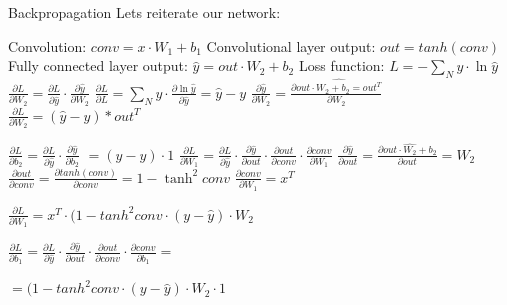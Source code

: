 \documentclass[12pt]{beamer}
\begin{document}
\begin{frame}{Backpropagation}
Lets  reiterate our network:

Convolution:                   $conv = x \cdot W_1 +b_1$ \newline
Convolutional layer output:    $out = tanh(conv)$\newline
Fully connected layer output:  $\hat{y} = out \cdot W_2 + b_2$\newline
Loss function:				   $L = - \sum_{N} y \cdot \ln{\hat{y}}$ \newline
\newline \newline
$\frac{\partial{L}}{\partial{W_2}} = \frac{\partial{L}}{\partial{\hat{y}}} \cdot \frac{\partial{\hat{y}}}{\partial{W_2}}$
\newline
$\frac{\partial{L}}{\partial{L}} = \sum_{N} y \cdot \frac{\partial{\ln{\hat{y}}}}{\partial{\hat{y}}} = \hat{y}-y$\newline
$\frac{\partial{\hat{y}}}{\partial{W_2}} = \frac{\partial{\hat{out \cdot W_2 +b_2 = out^T}}}{\partial{W_2}}$
$\frac{\partial{L}}{\partial{W_2}} = (\hat{y} - y) * out^T $
\end{frame}
\begin{frame}
$\frac{\partial{L}}{\partial{b_2}} = \frac{\partial{L}}{\partial{\hat{y}}} \cdot \frac{\partial{\hat{y}}}{\partial{b_2}}$\newline
$ = (\hat{y}-y) \cdot 1$\newline \newline
$\frac{\partial{L}}{\partial{W_1}} = \frac{\partial{L}}{\partial{\hat{y}}} \cdot \frac{\partial{\hat{y}}}{\partial{out}}\cdot \frac{\partial{out}}{\partial{conv}} \cdot \frac{\partial{conv}}{\partial{W_1}}$
\newline
$\frac{\partial{\hat{y}}}{\partial{out}} = \frac{\partial{\hat{out \cdot W_2 +b_2}}}{\partial{out}} =W_2$
$\frac{\partial{out}}{\partial{conv}} = \frac{\partial{ tanh(conv)}}{\partial{conv}} = 1 - \tanh^2{conv}$ 
$\frac{\partial{conv}}{\partial{W_1}} = x^T$

$\frac{\partial{L}}{\partial{W_1}} = x^T \cdot (1-tanh^2{conv} \cdot (y-\hat{y}) \cdot W_2 $



$\frac{\partial{L}}{\partial{b_1}} = \frac{\partial{L}}{\partial{\hat{y}}} \cdot \frac{\partial{\hat{y}}}{\partial{out}}\cdot \frac{\partial{out}}{\partial{conv}} \cdot \frac{\partial{conv}}{\partial{b_1}} = $

$ =  (1-tanh^2{conv} \cdot (y-\hat{y}) \cdot W_2 \cdot 1$




\end{frame}
\end{document}
